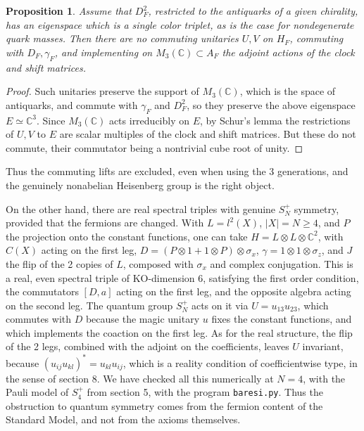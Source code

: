 \documentclass[11pt]{amsart}
\newtheorem{proposition}[theorem]{Proposition}
\theoremstyle{definition}
\begin{document}
\begin{proposition}
Assume that $D_F^2$, restricted to the antiquarks of a given chirality, has an eigenspace which is a single color triplet, as is the case for nondegenerate quark masses. Then there are no commuting unitaries $U,V$ on $H_F$, commuting with $D_F,\gamma_F$, and implementing on $M_3(\mathbb C)\subset A_F$ the adjoint actions of the clock and shift matrices.
\end{proposition}

\begin{proof}
Such unitaries preserve the support of $M_3(\mathbb C)$, which is the space of antiquarks, and commute with $\gamma_F$ and $D_F^2$, so they preserve the above eigenspace $E\simeq\mathbb C^3$. Since $M_3(\mathbb C)$ acts irreducibly on $E$, by Schur's lemma the restrictions of $U,V$ to $E$ are scalar multiples of the clock and shift matrices. But these do not commute, their commutator being a nontrivial cube root of unity.
\end{proof}

Thus the commuting lifts are excluded, even when using the 3 generations, and the genuinely nonabelian Heisenberg group is the right object.

On the other hand, there are real spectral triples with genuine $S_N^+$ symmetry, provided that the fermions are changed. With $L=l^2(X)$, $|X|=N\geq4$, and $P$ the projection onto the constant functions, one can take $H=L\otimes L\otimes\mathbb C^2$, with $C(X)$ acting on the first leg, $D=(P\otimes1+1\otimes P)\otimes\sigma_x$, $\gamma=1\otimes1\otimes\sigma_z$, and $J$ the flip of the 2 copies of $L$, composed with $\sigma_x$ and complex conjugation. This is a real, even spectral triple of KO-dimension $6$, satisfying the first order condition, the commutators $[D,a]$ acting on the first leg, and the opposite algebra acting on the second leg. The quantum group $S_N^+$ acts on it via $U=u_{13}u_{23}$, which commutes with $D$ because the magic unitary $u$ fixes the constant functions, and which implements the coaction on the first leg. As for the real structure, the flip of the 2 legs, combined with the adjoint on the coefficients, leaves $U$ invariant, because $(u_{ij}u_{kl})^*=u_{kl}u_{ij}$, which is a reality condition of coefficientwise type, in the sense of section 8. We have checked all this numerically at $N=4$, with the Pauli model of $S_4^+$ from section 5, with the program {\tt baresi.py}. Thus the obstruction to quantum symmetry comes from the fermion content of the Standard Model, and not from the axioms themselves.
\end{document}
